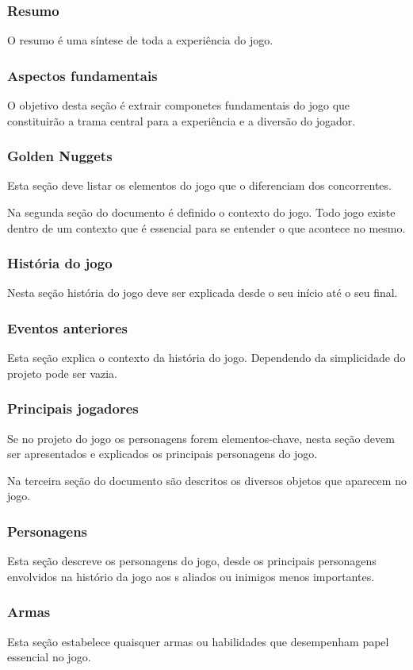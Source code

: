 \subsubsection{Resumo}
O resumo é uma síntese de toda a experiência do jogo.
\subsubsection{Aspectos fundamentais}
O objetivo desta seção é extrair componetes fundamentais do jogo que constituirão a trama central para a experiência e a diversão do jogador.
\subsubsection{Golden Nuggets}
Esta seção deve listar os elementos do jogo que o diferenciam dos concorrentes.


Na segunda seção do documento é definido o contexto do jogo. Todo jogo existe dentro de um contexto que é essencial para se entender o que acontece no mesmo.
\subsubsection{História do jogo}
Nesta seção  história do jogo deve ser explicada desde o seu início até o seu final.
\subsubsection{Eventos anteriores}
Esta seção explica o contexto da história do jogo. Dependendo da simplicidade do projeto pode ser vazia.
\subsubsection{Principais jogadores}
Se no projeto do jogo os personagens forem elementos-chave, nesta seção devem ser apresentados e explicados os principais personagens do jogo.


Na terceira seção do documento são descritos os diversos objetos que aparecem no jogo.
\subsubsection{Personagens}
Esta seção descreve os personagens do jogo, desde os principais personagens envolvidos na histório da jogo aos \npc{}s aliados ou inimigos menos importantes.
\subsubsection{Armas}
Esta seção estabelece quaisquer armas ou habilidades que desempenham papel essencial no jogo.
